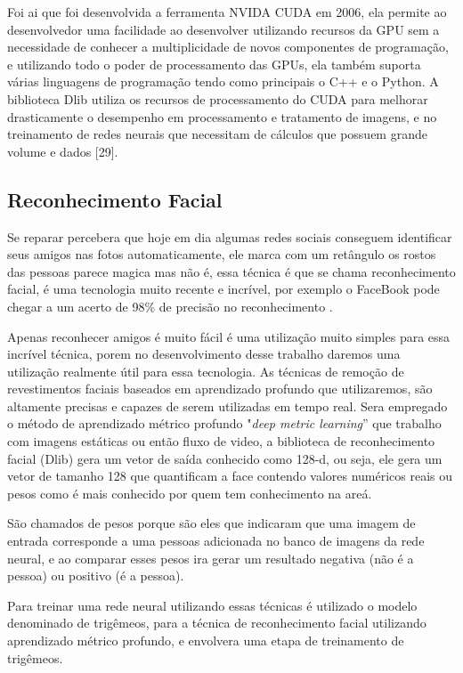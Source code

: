 Foi ai que foi desenvolvida a ferramenta NVIDA CUDA em 2006, ela permite ao desenvolvedor uma facilidade ao desenvolver utilizando recursos da GPU sem a necessidade de conhecer a multiplicidade de novos componentes de programação, e utilizando todo o poder de processamento das GPUs, ela também suporta várias linguagens de programação tendo como principais o C++ e o Python.
A biblioteca Dlib utiliza os recursos de processamento do CUDA para melhorar drasticamente o desempenho em processamento e tratamento de imagens, e no treinamento de redes neurais que necessitam de cálculos que possuem grande volume e dados [29].

\subsection{Reconhecimento Facial}
\label{sec:recface}
Se reparar percebera que hoje em dia algumas redes sociais conseguem identificar seus amigos nas fotos automaticamente, ele marca com um retângulo os rostos das pessoas parece magica mas não é, essa técnica é que se chama reconhecimento facial, é uma tecnologia muito recente e incrível, por exemplo o FaceBook pode chegar a um acerto de 98\% de precisão no reconhecimento \cite{adamgeitgey}.


Apenas reconhecer amigos é muito fácil é uma utilização muito simples para essa incrível técnica, porem no desenvolvimento desse trabalho daremos uma utilização realmente útil para essa tecnologia.
As técnicas de remoção de revestimentos faciais baseados em aprendizado profundo que utilizaremos, são altamente precisas e capazes de serem utilizadas em tempo real. Sera empregado o método de aprendizado métrico profundo "\textit{deep metric learning}” que trabalho com imagens estáticas ou então fluxo de video, a biblioteca de reconhecimento facial (Dlib) gera um vetor de saída conhecido como 128-d, ou seja, ele gera um vetor de tamanho 128 que quantificam a face contendo valores numéricos reais ou pesos como é mais conhecido por quem tem conhecimento na areá. 

São chamados de pesos porque são eles que indicaram que uma imagem de entrada corresponde a uma pessoas adicionada no banco de imagens da rede neural, e ao comparar esses pesos ira gerar um resultado negativa (não é a pessoa) ou positivo (é a pessoa). 

Para treinar uma rede neural utilizando essas técnicas é utilizado o modelo denominado de trigêmeos, para a técnica de reconhecimento facial utilizando aprendizado métrico profundo, e envolvera uma etapa de treinamento de trigêmeos.

